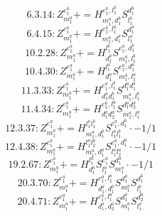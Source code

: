 \documentclass[letterpaper,10pt,fleqn,leqno,onecolumn]{article}
\begin{document}
\begin{equation} \;\;\;\;\;\;  6.3.14: Z^{e_{1}^{a}}_{m_{1}^{a}}+=H^{e_{1}^{a},l_{1}^{b}}_{m_{1}^{a},d_{1}^{b}}S^{d_{1}^{b}}_{l_{1}^{b}} \end{equation}
\begin{equation} \;\;\;\;\;\;  6.4.15: Z^{e_{1}^{a}}_{m_{1}^{a}}+=H^{e_{1}^{a},l_{1}^{a}}_{m_{1}^{a},d_{1}^{a}}S^{d_{1}^{a}}_{l_{1}^{a}} \end{equation}
\begin{equation} \;\;\;\;\;\;  10.2.28: Z^{e_{1}^{a}}_{m_{1}^{a}}+=H^{l_{1}^{b}}_{d_{1}^{b}}S^{e_{1}^{a},d_{1}^{b}}_{m_{1}^{a},l_{1}^{b}} \end{equation}
\begin{equation} \;\;\;\;\;\;  10.4.30: Z^{e_{1}^{a}}_{m_{1}^{a}}+=H^{l_{1}^{a}}_{d_{1}^{a}}S^{e_{1}^{a},d_{1}^{a}}_{m_{1}^{a},l_{1}^{a}} \end{equation}
\begin{equation} \;\;\;\;\;\;  11.3.33: Z^{e_{1}^{a}}_{m_{1}^{a}}+=H^{e_{1}^{a},l_{1}^{b}}_{d_{1}^{a}d_{1}^{b}}S^{d_{1}^{a}d_{1}^{b}}_{m_{1}^{a},l_{1}^{b}} \end{equation}
\begin{equation} \;\;\;\;\;\;  11.4.34: Z^{e_{1}^{a}}_{m_{1}^{a}}+=H^{e_{1}^{a},l_{1}^{a}}_{d_{1}^{a}d_{2}^{a}}S^{d_{1}^{a}d_{2}^{a}}_{m_{1}^{a},l_{1}^{a}} \end{equation}
\begin{equation} \;\;\;\;\;\;  12.3.37: Z^{e_{1}^{a}}_{m_{1}^{a}}+=H^{l_{1}^{a}l_{1}^{b}}_{m_{1}^{a},d_{1}^{b}}S^{e_{1}^{a},d_{1}^{b}}_{l_{1}^{a}l_{1}^{b}}\cdot -1/1 \end{equation}
\begin{equation} \;\;\;\;\;\;  12.4.38: Z^{e_{1}^{a}}_{m_{1}^{a}}+=H^{l_{1}^{a}l_{2}^{a}}_{m_{1}^{a},d_{1}^{a}}S^{e_{1}^{a},d_{1}^{a}}_{l_{1}^{a}l_{2}^{a}}\cdot -1/1 \end{equation}
\begin{equation} \;\;\;\;\;\;  19.2.67: Z^{e_{1}^{a}}_{m_{1}^{a}}+=H^{l_{1}^{a}}_{d_{1}^{a}}S^{e_{1}^{a}}_{l_{1}^{a}}S^{d_{1}^{a}}_{m_{1}^{a}}\cdot -1/1 \end{equation}
\begin{equation} \;\;\;\;\;\;  20.3.70: Z^{e_{1}^{a}}_{m_{1}^{a}}+=H^{e_{1}^{a},l_{1}^{b}}_{d_{1}^{a},d_{1}^{b}}S^{d_{1}^{a}}_{m_{1}^{a}}S^{d_{1}^{b}}_{l_{1}^{b}} \end{equation}
\begin{equation} \;\;\;\;\;\;  20.4.71: Z^{e_{1}^{a}}_{m_{1}^{a}}+=H^{e_{1}^{a},l_{1}^{a}}_{d_{1}^{a},d_{2}^{a}}S^{d_{1}^{a}}_{m_{1}^{a}}S^{d_{2}^{a}}_{l_{1}^{a}} \end{equation}
\end{document}
